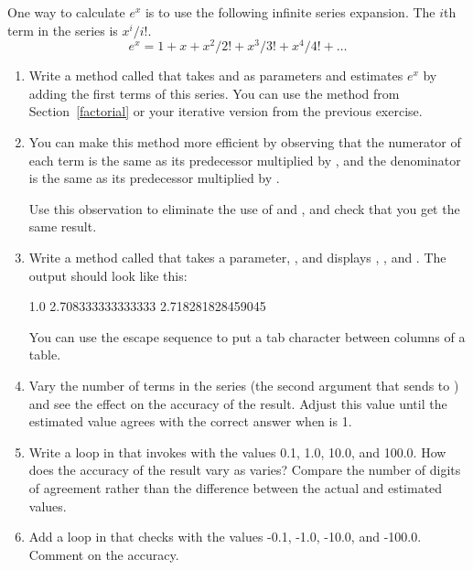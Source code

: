 \begin{exercise}  %


One way to calculate $e^x$ is to use the following infinite series expansion.
The $i$th term in the series is $x^i / i!$.
%
\[ e^x = 1 + x + x^2 / 2! + x^3 / 3! + x^4 / 4! + \ldots \]
%
\begin{enumerate}

\item Write a method called  that takes  and  as parameters and estimates $e^x$ by adding the first  terms of this series.
You can use the  method from Section~\ref{factorial} or your iterative version from the previous exercise.


\item You can make this method more efficient by observing that the numerator of each term is the same as its predecessor multiplied by , and the denominator is the same as its predecessor multiplied by .

Use this observation to eliminate the use of  and , and check that you get the same result.

\item Write a method called  that takes a parameter, , and displays , , and .
The output should look like this:

\begin{stdout}
1.0     2.708333333333333     2.718281828459045
\end{stdout}

You can use the escape sequence  to put a tab character between columns of a table.

\item Vary the number of terms in the series (the second argument that  sends to ) and see the effect on the accuracy of the result.
Adjust this value until the estimated value agrees with the correct answer when  is 1.

\item Write a loop in  that invokes  with the values 0.1, 1.0, 10.0, and 100.0.
How does the accuracy of the result vary as  varies?
Compare the number of digits of agreement rather than the difference between the actual and estimated values.

\item Add a loop in  that checks  with the values -0.1, -1.0, -10.0, and -100.0.
Comment on the accuracy.

\end{enumerate}

\end{exercise}


